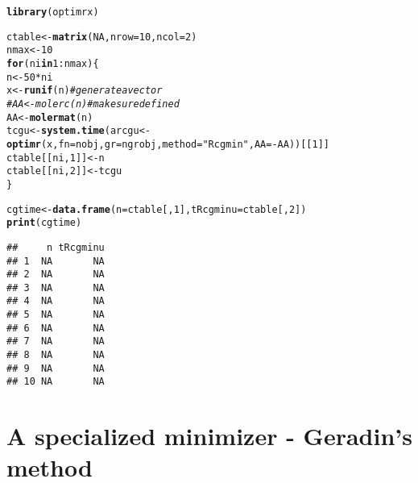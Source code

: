 \documentclass[10pt]{article}\usepackage[]{graphicx}\usepackage[]{color}
\makeatletter
\newcommand{\hlnum}[1]{\textcolor[rgb]{0.686,0.059,0.569}{#1}}%
\newcommand{\hlstr}[1]{\textcolor[rgb]{0.192,0.494,0.8}{#1}}%
\newcommand{\hlcom}[1]{\textcolor[rgb]{0.678,0.584,0.686}{\textit{#1}}}%
\newcommand{\hlopt}[1]{\textcolor[rgb]{0,0,0}{#1}}%
\newcommand{\hlstd}[1]{\textcolor[rgb]{0.345,0.345,0.345}{#1}}%
\newcommand{\hlkwa}[1]{\textcolor[rgb]{0.161,0.373,0.58}{\textbf{#1}}}%
\newcommand{\hlkwb}[1]{\textcolor[rgb]{0.69,0.353,0.396}{#1}}%
\newcommand{\hlkwc}[1]{\textcolor[rgb]{0.333,0.667,0.333}{#1}}%
\newcommand{\hlkwd}[1]{\textcolor[rgb]{0.737,0.353,0.396}{\textbf{#1}}}%
\newenvironment{kframe}{%
 \def\at@end@of@kframe{}%
 \ifinner\ifhmode%
  \def\at@end@of@kframe{\end{minipage}}%
  \begin{minipage}{\columnwidth}%
 \fi\fi%
 \def\FrameCommand##1{\hskip\@totalleftmargin \hskip-\fboxsep
 \colorbox{shadecolor}{##1}\hskip-\fboxsep
     \hskip-\linewidth \hskip-\@totalleftmargin \hskip\columnwidth}%
 \MakeFramed {\advance\hsize-\width
   \@totalleftmargin\z@ \linewidth\hsize
   \@setminipage}}%
 {\par\unskip\endMakeFramed%
 \at@end@of@kframe}
\newenvironment{knitrout}{}{} %
\makeatother
\begin{document}
\begin{knitrout}\scriptsize
{}\color{fgcolor}\begin{kframe}
\begin{alltt}
\hlkwd{library}\hlstd{(optimrx)}
\end{alltt}


{\ttfamily\noindent\bfseries\color{errorcolor}{\#\# Error in library(optimrx): there is no package called 'optimrx'}}\begin{alltt}
\hlstd{ctable}\hlkwb{<-}\hlkwd{matrix}\hlstd{(}\hlnum{NA}\hlstd{,} \hlkwc{nrow}\hlstd{=}\hlnum{10}\hlstd{,} \hlkwc{ncol}\hlstd{=}\hlnum{2}\hlstd{)}
\hlstd{nmax}\hlkwb{<-}\hlnum{10}
\hlkwa{for} \hlstd{(ni} \hlkwa{in} \hlnum{1}\hlopt{:}\hlstd{nmax)\{}
  \hlstd{n}\hlkwb{<-}\hlnum{50}\hlopt{*}\hlstd{ni}
  \hlstd{x}\hlkwb{<-}\hlkwd{runif}\hlstd{(n)} \hlcom{# generate a vector }
\hlcom{#  AA<-molerc(n) # make sure defined}
  \hlstd{AA}\hlkwb{<-}\hlkwd{molermat}\hlstd{(n)}
  \hlstd{tcgu}\hlkwb{<-}\hlkwd{system.time}\hlstd{(arcgu}\hlkwb{<-}\hlkwd{optimr}\hlstd{(x,} \hlkwc{fn}\hlstd{=nobj,} \hlkwc{gr}\hlstd{=ngrobj,} \hlkwc{method}\hlstd{=}\hlstr{"Rcgmin"}\hlstd{,} \hlkwc{AA}\hlstd{=}\hlopt{-}\hlstd{AA))[[}\hlnum{1}\hlstd{]]}
  \hlstd{ctable[[ni,}\hlnum{1}\hlstd{]]} \hlkwb{<-} \hlstd{n}
  \hlstd{ctable[[ni,}\hlnum{2}\hlstd{]]} \hlkwb{<-} \hlstd{tcgu}
\hlstd{\}}
\end{alltt}


{\ttfamily\noindent\bfseries{}}

{\ttfamily\noindent\itshape\color{messagecolor}{\#\# Timing stopped at: 0.004 0 0}}\begin{alltt}
\hlstd{cgtime}\hlkwb{<-}\hlkwd{data.frame}\hlstd{(}\hlkwc{n}\hlstd{=ctable[,}\hlnum{1}\hlstd{],} \hlkwc{tRcgminu}\hlstd{=ctable[,}\hlnum{2}\hlstd{])}
\hlkwd{print}\hlstd{(cgtime)}
\end{alltt}
\begin{verbatim}
##     n tRcgminu
## 1  NA       NA
## 2  NA       NA
## 3  NA       NA
## 4  NA       NA
## 5  NA       NA
## 6  NA       NA
## 7  NA       NA
## 8  NA       NA
## 9  NA       NA
## 10 NA       NA
\end{verbatim}
\end{kframe}
\end{knitrout}

\section{A specialized minimizer - Geradin's method}
\end{document}
